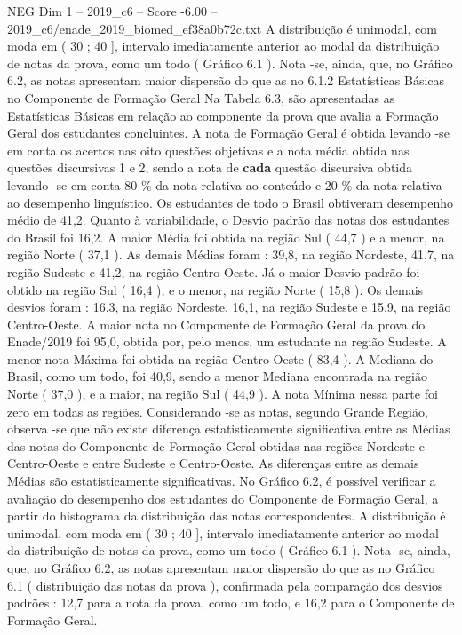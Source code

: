 \begin{textsample}{NEG Dim 1 – 2019\_c6 – Score -6.00 – 2019\_c6/enade\_2019\_biomed\_ef38a0b72c.txt}
A distribuição é unimodal, com moda em ( 30 ; 40 ], intervalo imediatamente anterior ao modal da distribuição de notas da prova, como um todo ( Gráfico 6.1 ).
Nota -se, ainda, que, no Gráfico 6.2, as notas apresentam maior dispersão do que as no 6.1.2 Estatísticas Básicas no Componente de Formação Geral Na Tabela 6.3, são apresentadas as Estatísticas Básicas em relação ao componente da prova que avalia a Formação Geral dos estudantes concluintes.
A nota de Formação Geral é obtida levando -se em conta os acertos nas oito questões objetivas e a nota média obtida nas questões discursivas 1 e 2, sendo a nota de \textbf{cada} questão discursiva obtida levando -se em conta 80 \% da nota relativa ao conteúdo e 20 \% da nota relativa ao desempenho linguístico.
Os estudantes de todo o Brasil obtiveram desempenho médio de 41,2.
Quanto à variabilidade, o Desvio padrão das notas dos estudantes do Brasil foi 16,2.
A maior Média foi obtida na região Sul ( 44,7 ) e a menor, na região Norte ( 37,1 ).
As demais Médias foram : 39,8, na região Nordeste, 41,7, na região Sudeste e 41,2, na região Centro-Oeste.
Já o maior Desvio padrão foi obtido na região Sul ( 16,4 ), e o menor, na região Norte ( 15,8 ).
Os demais desvios foram : 16,3, na região Nordeste, 16,1, na região Sudeste e 15,9, na região Centro-Oeste.
A maior nota no Componente de Formação Geral da prova do Enade/2019 foi 95,0, obtida por, pelo menos, um estudante na região Sudeste.
A menor nota Máxima foi obtida na região Centro-Oeste ( 83,4 ).
A Mediana do Brasil, como um todo, foi 40,9, sendo a menor Mediana encontrada na região Norte ( 37,0 ), e a maior, na região Sul ( 44,9 ).
A nota Mínima nessa parte foi zero em todas as regiões.
Considerando -se as notas, segundo Grande Região, observa -se que não existe diferença estatisticamente significativa entre as Médias das notas do Componente de Formação Geral obtidas nas regiões Nordeste e Centro-Oeste e entre Sudeste e Centro-Oeste.
As diferenças entre as demais Médias são estatisticamente significativas.
No Gráfico 6.2, é possível verificar a avaliação do desempenho dos estudantes do Componente de Formação Geral, a partir do histograma da distribuição das notas correspondentes.
A distribuição é unimodal, com moda em ( 30 ; 40 ], intervalo imediatamente anterior ao modal da distribuição de notas da prova, como um todo ( Gráfico 6.1 ).
Nota -se, ainda, que, no Gráfico 6.2, as notas apresentam maior dispersão do que as no Gráfico 6.1 ( distribuição das notas da prova ), confirmada pela comparação dos desvios padrões : 12,7 para a nota da prova, como um todo, e 16,2 para o Componente de Formação Geral.

\end{textsample}
